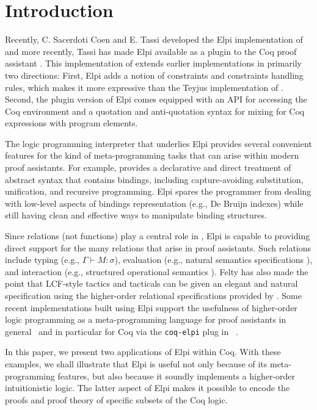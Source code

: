 \section{Introduction}
\label{sec:intro}

Recently, C. Sacerdoti Coen and E. Tassi developed the Elpi
implementation \cite{dunchev15lpar} of \lP \cite{miller12proghol} and
more recently, Tassi has made Elpi available as a plugin to the Coq
proof assistant \cite{tassi18coqpl}.  This implementation of \lP
extends earlier implementations in primarily two directions:  First,
Elpi adds a notion of constraints and constraints handling rules, which makes it more expressive than
the Teyjus implementation \cite{nadathur99cade} of \lP. Second, the
plugin version of Elpi comes equipped with an API for accessing the
Coq environment and a quotation and anti-quotation syntax for mixing
for Coq expressions with \lP program elements.

The logic programming interpreter that underlies Elpi provides several
convenient features for the kind of meta-programming tasks that can
arise within modern proof assistants.  For example, \lP provides a
declarative and direct treatment of abstract syntax that contains
bindings, including capture-avoiding substitution,
unification, and recursive programming.  Elpi spares the
programmer from dealing with low-level aspects of bindings
representation (e.g., De Bruijn indexes) while still having clean and
effective ways to manipulate binding structures.

Since relations (not functions) play a central role in \lP, Elpi is
capable to providing direct support for the many relations that arise
in proof assistants.  Such relations include typing (e.g.,
$\Gamma\vdash M\colon\sigma$), evaluation (e.g., natural semantics specifications
\cite{kahn87stacs,hannan93jfp}), and interaction (e.g., structured
operational semantics \cite{plotkin81,milner89book}).  Felty has also
made the point that LCF-style tactics and tacticals can be given an
elegant and natural specification using the higher-order relational
specifications provided by \lP \cite{felty93jar}.  Some recent
implementations built using Elpi
support the usefulness of
higher-order logic programming as a meta-programming language 
for proof assistants in general~\cite{DunchevCT16,coen19mscs} and in particular
for Coq via the \texttt{coq-elpi} plug in~\cite{tassi19itp,CohenST20} .

In this paper, we present two applications of Elpi within Coq. With
these examples, we shall illustrate that Elpi is useful not only
because of its meta-programming features,
but also because it soundly
implements a higher-order intuitionistic logic.  The latter aspect of
Elpi makes it possible to encode the proofs and proof theory of
specific subsets of the Coq logic.


